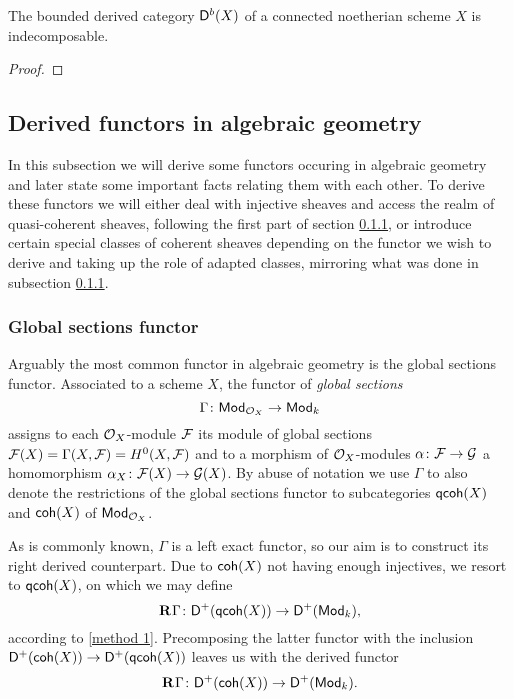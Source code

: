 \begin{theorem}
    The bounded derived category $\mathsf{D}^b(X)$ of a connected noetherian scheme $X$ is indecomposable.
\end{theorem}

\begin{proof}
    
\end{proof}


\newpage

\subsection{Derived functors in algebraic geometry}

In this subsection we will derive some functors occuring in algebraic geometry and later state some important facts relating them with each other. To derive these functors we will either deal with injective sheaves and access the realm of quasi-coherent sheaves, following the first part of section \ref{}, or introduce certain special classes of coherent sheaves depending on the functor we wish to derive and taking up the role of adapted classes, mirroring what was done in subsection \ref{}.

\subsubsection{Global sections functor}
Arguably the most common functor in algebraic geometry is the global sections functor. Associated to a scheme $X$, the functor of \emph{global sections}
\[
    \Gamma \colon \mathsf{Mod}_{\mathcal O_X} \to \mathsf{Mod}_{k}
\]
assigns to each $\mathcal O_X$-module $\mathcal F$ its module of global sections $\mathcal F(X) = \Gamma(X, \mathcal F) = H^0(X, \mathcal F)$ and to a morphism of $\mathcal O_X$-modules $\alpha\colon \mathcal F \to \mathcal G$ a homomorphism $\alpha_X \colon \mathcal F(X) \to \mathcal G(X)$.
By abuse of notation we use $\Gamma$ to also denote the restrictions of the global sections functor to subcategories $\mathsf{qcoh}(X)$ and $\mathsf{coh}(X)$ of $\mathsf{Mod}_{\mathcal O_X}$.

As is commonly known, $\Gamma$ is a left exact functor, so our aim is to construct its right derived counterpart. Due to $\mathsf{coh}(X)$ not having enough injectives, we resort to $\mathsf{qcoh}(X)$, on which we may define 
\[
    \mathbf{R}^{}\Gamma\colon \mathsf{D}^+(\mathsf{qcoh}(X)) \to \mathsf{D}^+(\mathsf{Mod}_{k}),
\]
according to \ref{method 1}. Precomposing the latter functor with the inclusion $\mathsf{D}^+(\mathsf{coh}(X)) \to \mathsf{D}^+(\mathsf{qcoh}(X))$ leaves us with the derived functor
\[
    \mathbf{R}^{}\Gamma \colon \mathsf{D}^+(\mathsf{coh}(X)) \to \mathsf{D}^+(\mathsf{Mod}_{k}).
\]








